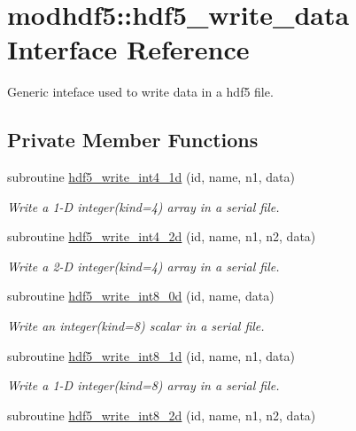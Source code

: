 \hypertarget{interfacemodhdf5_1_1hdf5__write__data}{\section{modhdf5\-:\-:hdf5\-\_\-write\-\_\-data Interface Reference}
\label{interfacemodhdf5_1_1hdf5__write__data}
}


Generic inteface used to write data in a hdf5 file.  


\subsection*{Private Member Functions}
\begin{DoxyCompactItemize}
\item 
subroutine \hyperlink{interfacemodhdf5_1_1hdf5__write__data_a33e6b35760f15f06a5804cd0caa3da0b}{hdf5\-\_\-write\-\_\-int4\-\_\-1d} (id, name, n1, data)
\begin{DoxyCompactList}\small\item\em Write a 1-\/\-D integer(kind=4) array in a serial file. \end{DoxyCompactList}\item 
subroutine \hyperlink{interfacemodhdf5_1_1hdf5__write__data_a3c4d3b976cc7ded0445f44f4806119eb}{hdf5\-\_\-write\-\_\-int4\-\_\-2d} (id, name, n1, n2, data)
\begin{DoxyCompactList}\small\item\em Write a 2-\/\-D integer(kind=4) array in a serial file. \end{DoxyCompactList}\item 
subroutine \hyperlink{interfacemodhdf5_1_1hdf5__write__data_a3d54b82d734756ac3b7e04eefa3f42b3}{hdf5\-\_\-write\-\_\-int8\-\_\-0d} (id, name, data)
\begin{DoxyCompactList}\small\item\em Write an integer(kind=8) scalar in a serial file. \end{DoxyCompactList}\item 
subroutine \hyperlink{interfacemodhdf5_1_1hdf5__write__data_ace548f4140d1a7c171dfa972edaae0ac}{hdf5\-\_\-write\-\_\-int8\-\_\-1d} (id, name, n1, data)
\begin{DoxyCompactList}\small\item\em Write a 1-\/\-D integer(kind=8) array in a serial file. \end{DoxyCompactList}\item 
subroutine \hyperlink{interfacemodhdf5_1_1hdf5__write__data_aeb5d82f4adffdf6967fde4ab3844674b}{hdf5\-\_\-write\-\_\-int8\-\_\-2d} (id, name, n1, n2, data)

\end{DoxyCompactItemize}

